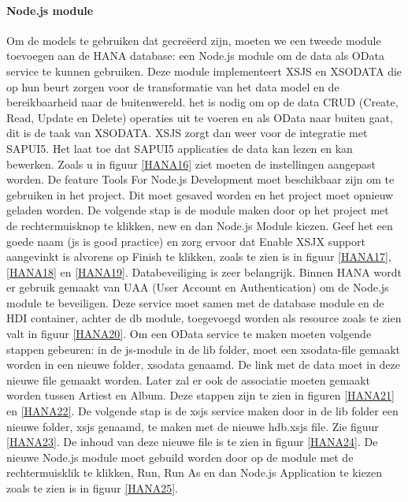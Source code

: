             \paragraph{Node.js module}
            Om de models te gebruiken dat gecreëerd zijn, moeten we een tweede module toevoegen aan de HANA database: een Node.js module om de data als OData service te kunnen gebruiken.
            Deze module implementeert XSJS en XSODATA die op hun beurt zorgen voor de transformatie van het data model en de bereikbaarheid naar de buitenwereld. het is nodig om op de data CRUD (Create, Read, Update en Delete) operaties uit te voeren en als OData naar buiten gaat, dit is de taak van XSODATA. XSJS zorgt dan weer voor de integratie met SAPUI5. Het laat toe dat SAPUI5 applicaties de data kan lezen en kan bewerken.
            Zoals u in figuur \ref{HANA16} ziet moeten de instellingen aangepast worden. De feature Tools For Node.js Development moet beschikbaar zijn om te gebruiken in het project. Dit moet gesaved worden en het project moet opnieuw geladen worden. De volgende stap is de module maken door op het project met de rechtermuisknop te klikken, new en dan Node.js Module kiezen. Geef het een goede naam (js is good practice) en zorg ervoor dat Enable XSJX support aangevinkt is alvorens op Finish te klikken, zoals te zien is in figuur \ref{HANA17}, \ref{HANA18} en \ref{HANA19}.
            Databeveiliging is zeer belangrijk. Binnen HANA wordt er gebruik gemaakt van UAA (User Account en Authentication) om de Node.js module te beveiligen. Deze service moet samen met de database module en de HDI container, achter de db module, toegevoegd worden als resource zoals te zien valt in figuur \ref{HANA20}.
            Om een OData service te maken moeten volgende stappen gebeuren: in de js-module in de lib folder, moet een xsodata-file gemaakt worden in een nieuwe folder, xsodata genaamd. De link met de data moet in deze nieuwe file gemaakt worden. Later zal er ook de associatie moeten gemaakt worden tussen Artiest en Album. Deze stappen zijn te zien in figuren \ref{HANA21} en \ref{HANA22}.
            De volgende stap is de xsjs service maken door in de lib folder een nieuwe folder, xsjs genaamd, te maken met de nieuwe hdb.xsjs file. Zie figuur \ref{HANA23}. De inhoud van deze nieuwe file is te zien in figuur \ref{HANA24}.
            De nieuwe Node.js module moet gebuild worden door op de module met de rechtermuisklik te klikken, Run, Run As en dan Node.js Application te kiezen zoals te zien is in figuur \ref{HANA25}.
            
